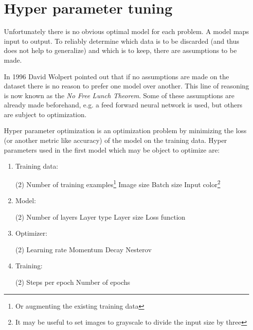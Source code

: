\section{Hyper parameter tuning}

Unfortunately there is no obvious optimal model for each problem.
A model maps input to output.
To reliably determine which data is to be discarded (and thus does not help to generalize) and which is to keep, there are assumptions to be made. %

In 1996 David Wolpert pointed out that if no assumptions are made on the dataset there is no reason to prefer one model over another.
This line of reasoning is now known as the \textit{No Free Lunch Theorem}\cite{Wolpert1996}.
Some of these assumptions are already made beforehand, e.g. a feed forward neural network is used, but others are subject to optimization. %

Hyper parameter optimization is an optimization problem by minimizing the loss (or another metric like accuracy) of the model on the training data.
Hyper parameters used in the first model which may be object to optimize are:

\begin{enumerate}
    \item Training data:
    \begin{tasks}(2)
        \task Number of training examples\footnote{Or augmenting the existing training data}
        \task Image size
        \task Batch size
        \task Input color\footnote{It may be useful to set images to grayscale to divide the input size by three}
    \end{tasks}
    \item Model:
    \begin{tasks}(2)
        \task Number of layers
        \task Layer type
        \task Layer size
        \task Loss function
    \end{tasks}
    \item Optimizer:
    \begin{tasks}(2)
        \task Learning rate
        \task Momentum
        \task Decay
        \task Nesterov
    \end{tasks}
    \item Training:
    \begin{tasks}(2)
        \task Steps per epoch
        \task Number of epochs
    \end{tasks}
\end{enumerate}

